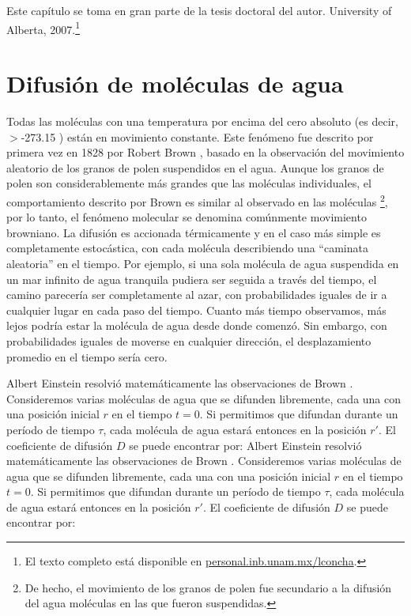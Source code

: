 
Este capítulo se toma en gran parte de la tesis doctoral del autor. University of Alberta, 2007.\footnote{El texto completo está disponible en \url{personal.inb.unam.mx/lconcha}.}

\section{Difusión de moléculas de agua}

Todas las moléculas con una temperatura por encima del cero absoluto (es decir, $>$-273.15 \degrees) están en movimiento constante. Este fenómeno fue descrito por primera vez en 1828 por Robert Brown \cite{Brown1828}, basado en la observación del movimiento aleatorio de los granos de polen suspendidos en el agua. Aunque los granos de polen son considerablemente más grandes que las moléculas individuales, el comportamiento descrito por Brown es similar al observado en las moléculas \footnote{De hecho, el movimiento de los granos de polen fue secundario a la difusión del agua moléculas en las que fueron suspendidas.}, por lo tanto, el fenómeno molecular se denomina comúnmente movimiento browniano. La difusión es accionada térmicamente y en el caso más simple es completamente estocástica, con cada molécula describiendo una ``caminata aleatoria'' en el tiempo. Por ejemplo, si una sola molécula de agua suspendida en un mar infinito de agua tranquila pudiera ser seguida a través del tiempo, el camino parecería ser completamente al azar, con probabilidades iguales de ir a cualquier lugar en cada paso del tiempo. Cuanto más tiempo observamos, más lejos podría estar la molécula de agua desde donde comenzó. Sin embargo, con probabilidades iguales de moverse en cualquier dirección, el desplazamiento promedio en el tiempo sería cero.

Albert Einstein resolvió matemáticamente las observaciones de Brown \cite{Einstein1905}. Consideremos varias moléculas de agua que se difunden libremente, cada una con una posición inicial $r$ en el tiempo {$t = 0$}. Si permitimos que  difundan durante un período de tiempo \(\tau\), cada molécula de agua estará entonces en la posición {$r'$}. El coeficiente de difusión {$D$} se puede encontrar por:
Albert Einstein resolvió matemáticamente las observaciones de Brown \cite{Einstein1905}. Consideremos varias moléculas de agua que se difunden libremente, cada una con una posición inicial $r$ en el tiempo {$t = 0$}. Si permitimos que  difundan durante un período de tiempo \(\tau\), cada molécula de agua estará entonces en la posición {$r'$}. El coeficiente de difusión {$D$} se puede encontrar por:

